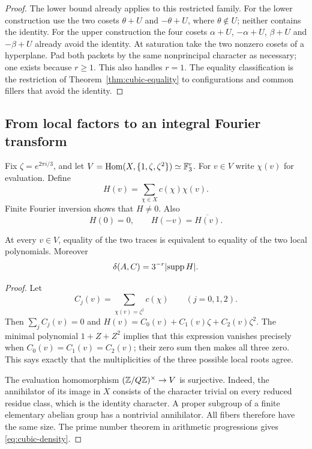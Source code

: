 \begin{proof}
The lower bound already applies to this restricted family. For the lower
construction use the two cosets $\theta+U$ and $-\theta+U$, where
$\theta\notin U$; neither contains the identity. For the upper
construction the four cosets $\alpha+U$, $-\alpha+U$, $\beta+U$ and
$-\beta+U$ already avoid the identity. At saturation take the two
nonzero cosets of a hyperplane. Pad both packets by the same nonprincipal
character as necessary; one exists because $r\geq1$. This also handles
$r=1$. The equality classification is the restriction of
Theorem~\ref{thm:cubic-equality} to configurations and common fillers
that avoid the identity.
\end{proof}

\subsection{From local factors to an integral Fourier transform}

Fix $\zeta=e^{2\pi i/3}$, and let
$V=\operatorname{Hom}(X,\{1,\zeta,\zeta^2\})\simeq\mathbb F_3^r$.
For $v\in V$ write $\chi(v)$ for evaluation. Define
\begin{equation}\label{eq:cubic-H}
 H(v)=\sum_{\chi\in X}c(\chi)\chi(v).
\end{equation}
Finite Fourier inversion shows that $H\ne0$. Also
\begin{equation}\label{eq:cubic-symmetry}
 H(0)=0,\qquad H(-v)=\overline{H(v)}.
\end{equation}

\begin{lemma}
\label{lem:cubic-trace}
At every $v\in V$, equality of the two traces is equivalent to equality of
the two local polynomials. Moreover
\begin{equation}\label{eq:cubic-density}
 \delta(A,C)=3^{-r}\lvert\operatorname{supp} H\rvert.
\end{equation}
\end{lemma}

\begin{proof}
Let
\[
 C_j(v)=\sum_{\chi(v)=\zeta^j}c(\chi)\qquad(j=0,1,2).
\]
Then $\sum_jC_j(v)=0$ and
$H(v)=C_0(v)+C_1(v)\zeta+C_2(v)\zeta^2$.
The minimal polynomial $1+Z+Z^2$ implies that this expression vanishes
precisely when $C_0(v)=C_1(v)=C_2(v)$; their zero sum then makes all three
zero. This says exactly that the multiplicities of the three possible
local roots agree.

The evaluation homomorphism $(\mathbb Z/Q\mathbb Z)^\times\to V$ is surjective. Indeed,
the annihilator of its image in $X$ consists of the character trivial on
every reduced residue class, which is the identity character. A proper
subgroup of a finite elementary abelian group has a nontrivial annihilator.
All fibers therefore have the same size. The prime number theorem in
arithmetic progressions gives \eqref{eq:cubic-density}.
\end{proof}

